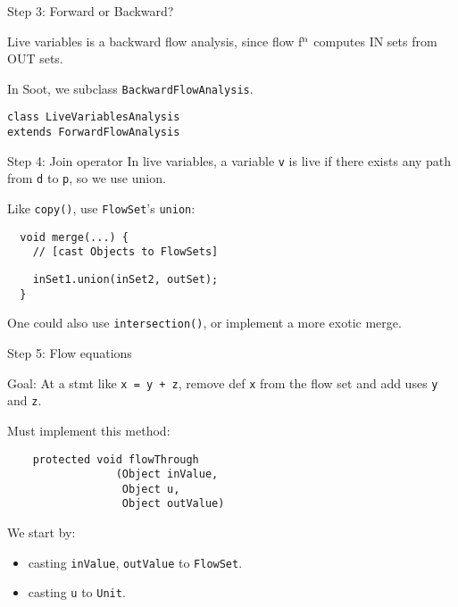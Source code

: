 \begin{slide}{Step 3: Forward or Backward?}

Live variables is a backward flow analysis, since flow
f$^{\mbox{\scriptsize n}}$ computes {\sf IN} sets from {\sf OUT} sets.

\qquad

In Soot, we subclass {\tt \red BackwardFlowAnalysis}.

\qquad

{\red \tt class LiveVariablesAnalysis \\ \qquad extends ForwardFlowAnalysis}
\end{slide}

\begin{slide}{Step 4: Join operator}
In live variables, a variable {\tt v} is live if there exists any path
from {\tt d} to {\tt p}, so we use union.

\qquad

Like {\tt copy()}, use {\tt FlowSet}'s {\tt union}:

\vspace*{0.05in}

\begin{verbatim}
  void merge(...) {
    // [cast Objects to FlowSets]
\end{verbatim}
{\red\verb+    inSet1.union(inSet2, outSet);+}\\
\verb+  }+

\vspace*{0.1in}

One could also use {\tt intersection()}, or implement a more exotic merge.

\end{slide}

\begin{slide}{Step 5: Flow equations}
\vspace*{-0.1in}

Goal: At a stmt like {\tt x = y + z}, remove def {\tt x} from the
flow set and add uses {\tt y} and {\tt z}.

\vspace*{0.1in}

Must implement this method:
\begin{verbatim}
    protected void flowThrough
                 (Object inValue, 
                  Object u, 
                  Object outValue)
\end{verbatim}

We start by:
\begin{itemize}
\item casting {\tt inValue}, {\tt outValue} to {\tt FlowSet}.

\item casting {\tt u} to {\tt Unit}.
\end{itemize}
\end{slide}


